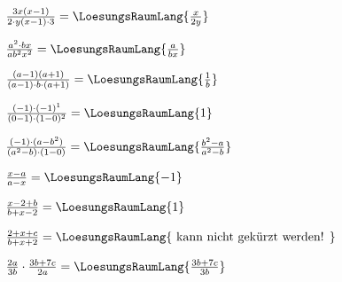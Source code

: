 \begin{bbwAufgabenBlock}
\item $\frac{3x(x-1)}{2\cdot{}y(x-1)\cdot{}3} = \LoesungsRaumLang{\frac{x}{2y}}$

\item $\frac{a^2\cdot{}bx}{ab^2x^2} = \LoesungsRaumLang{\frac{a}{bx}}$

\item $\frac{(a-1)(a+1)}{(a-1)\cdot{}b\cdot{}(a+1)} = \LoesungsRaumLang{\frac{1}{b}}$

\item $\frac{(-1)\cdot{}(-1)^1}{(0-1)\cdot{}(1-0)^2} = \LoesungsRaumLang{1}$

\item $\frac{(-1)\cdot{}(a-b^2)}{(a^2-b)\cdot{}(1-0)} = \LoesungsRaumLang{\frac{b^2-a}{a^2-b}}$

\item $\frac{x-a}{a-x} = \LoesungsRaumLang{-1}$

\item $\frac{x-2+b}{b+x-2} = \LoesungsRaumLang{1}$

\item $\frac{2+x+c}{b+x+2} = \LoesungsRaumLang{\textrm{ kann nicht
gekürzt werden! }}$

\item $\frac{2a}{3b} \cdot \frac{3b+7c}{2a} = \LoesungsRaumLang{\frac{3b+7c}{3b}}$

\end{bbwAufgabenBlock}


